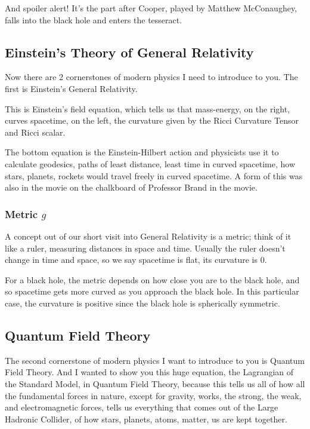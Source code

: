 \documentclass[10pt]{amsart}
\begin{document}
And spoiler alert! It's the part after Cooper, played by Matthew McConaughey, falls into the black hole and enters the tesseract.

\subsection{Einstein's Theory of General Relativity}

Now there are 2 cornerstones of modern physics I need to introduce to you. The first is Einstein's General Relativity.

This is Einstein's field equation, which tells us that mass-energy, on the right, curves spacetime, on the left, the curvature given by the Ricci Curvature Tensor and Ricci scalar.

The bottom equation is the Einstein-Hilbert action and physicists use it to calculate geodesics, paths of least distance, least time in curved spacetime, how stars, planets, rockets would travel freely in curved spacetime. A form of this was also in the movie on the chalkboard of Professor Brand in the movie.

\subsubsection{Metric $g$}

A concept out of our short visit into General Relativity is a metric; think of it like a ruler, measuring distances in space and time. Usually the ruler doesn't change in time and space, so we say spacetime is flat, its curvature is 0.

For a black hole, the metric depends on how close you are to the black hole, and so spacetime gets more curved as you approach the black hole. In this particular case, the curvature is positive since the black hole is spherically symmetric.

\subsection{Quantum Field Theory}

The second cornerstone of modern physics I want to introduce to you is Quantum Field Theory. And I wanted to show you this huge equation, the Lagrangian of the Standard Model, in Quantum Field Theory, because this tells us all of how all the fundamental forces in nature, except for gravity, works, the strong, the weak, and electromagnetic forces, tells us everything that comes out of the Large Hadronic Collider, of how stars, planets, atoms, matter, us are kept together.
\end{document}
